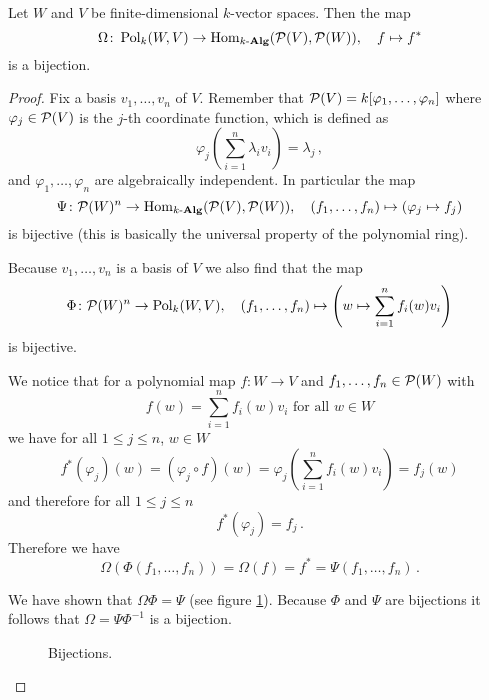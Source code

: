 \begin{prop}
  Let $W$ and $V$ be finite-dimensional $k$-vector spaces.
  Then the map
  \[
            \Omega
    \colon  \operatorname{Pol}_k(W,V)
    \to     \operatorname{Hom}_{k\text{-}\mathbf{Alg}}(\mathcal{P}(V), \mathcal{P}(W)),
    \quad   f
    \mapsto f^*
  \]
  is a bijection.
\end{prop}
\begin{proof}
  Fix a basis $v_1, \dotsc, v_n$ of $V$.
  Remember that $\mathcal{P}(V) = k[\varphi_1, \dotsc, \varphi_n]$ where $\varphi_j \in \mathcal{P}(V)$ is the $j$-th coordinate function, which is defined as
  \[
      \varphi_j\left( \sum_{i=1}^n \lambda_i v_i \right)
    = \lambda_j \,,
\]
  and $\varphi_1, \dotsc, \varphi_n$ are algebraically independent.
  In particular the map
  \[
            \Psi
    \colon  \mathcal{P}(W)^n
    \to     \operatorname{Hom}_{k\text{-}\mathbf{Alg}}(\mathcal{P}(V),\mathcal{P}(W)),
    \quad   (f_1, \dotsc, f_n)
    \mapsto (\varphi_j \mapsto f_j)
  \]
  is bijective (this is basically the universal property of the polynomial ring).
  
  Because $v_1, \dotsc, v_n$ is a basis of $V$ we also find that the map
  \[
            \Phi
    \colon  \mathcal{P}(W)^n
    \to     \operatorname{Pol}_k(W,V),
    \quad   (f_1, \dotsc, f_n)
    \mapsto \left(
                      w
              \mapsto \sum_{i=1}^n f_i(w)v_i
            \right)
  \]
  is bijective.
  
  We notice that for a polynomial map $f \colon W \to V$ and $f_1, \dotsc, f_n \in \mathcal{P}(W)$ with
  \[
      f(w)
    = \sum_{i=1}^n f_i(w) v_i
    \text{ for all }
    w \in W
  \]
  we have for all $1 \leq j \leq n$, $w \in W$
  \[
      f^*(\varphi_j)(w)
    = (\varphi_j \circ f)(w)
    = \varphi_j\left( \sum_{i=1}^n f_i(w) v_i \right)
    = f_j(w)
  \]
  and therefore for all $1 \leq j \leq n$
  \[
      f^*(\varphi_j)
    = f_j \,.
  \]
  Therefore we have
  \[
      \Omega(\Phi(f_1, \dotsc, f_n))
    = \Omega(f)
    = f^*
    = \Psi(f_1, \dotsc, f_n) \,.
  \]
  
  We have shown that $\Omega \Phi = \Psi$ (see figure \ref{fig: bijections}).
  Because $\Phi$ and $\Psi$ are bijections it follows that $\Omega = \Psi \Phi^{-1}$ is a bijection.
  \qedhere
  
  \begin{figure}\centering
    \caption{Bijections.}
    \label{fig: bijections}
  \end{figure}
\end{proof}





